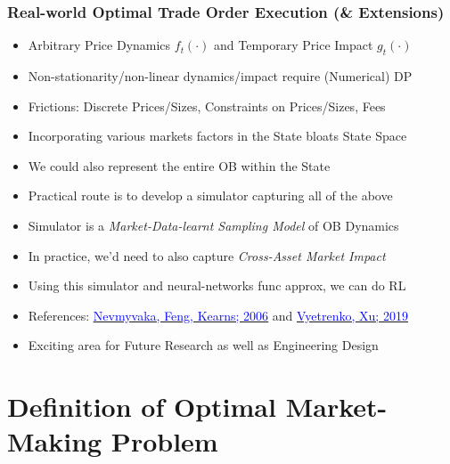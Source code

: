 \documentclass[handout]{beamer}
\begin{document}
\begin{frame}
\frametitle{Real-world Optimal Trade Order Execution (\& Extensions)}
\pause
\begin{itemize}[<+->]
\item Arbitrary Price Dynamics $f_t(\cdot)$ and Temporary Price Impact $g_t(\cdot)$
\item Non-stationarity/non-linear dynamics/impact require (Numerical) DP
\item Frictions: Discrete Prices/Sizes, Constraints on Prices/Sizes, Fees
\item Incorporating various markets factors in the State bloats State Space
\item We could also represent the entire OB within the State
\item Practical route is to develop a simulator capturing all of the above
\item Simulator is a {\em Market-Data-learnt Sampling Model} of OB Dynamics 
\item In practice, we'd need to also capture {\em Cross-Asset Market Impact}
\item Using this simulator and neural-networks func approx, we can do RL
\item References: \href{https://www.cis.upenn.edu/~mkearns/papers/rlexec.pdf}{\underline{\textcolor{blue}{Nevmyvaka, Feng, Kearns; 2006}}} and \href{https://arxiv.org/pdf/1906.02312.pdf}{\underline{\textcolor{blue}{Vyetrenko, Xu; 2019}}}
\item Exciting area for Future Research as well as Engineering Design
\end{itemize}
\end{frame}

\section{Definition of Optimal Market-Making Problem}
\end{document}
